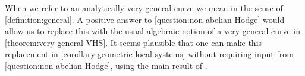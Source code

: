 \documentclass[12 pt]{amsart}
\theoremstyle{plain}
\theoremstyle{definition}
\theoremstyle{remark}
\numberwithin{equation}{section}
\begin{document}
When we refer to an analytically very general curve we mean in the sense
of \autoref{definition:general}.
A positive answer to \autoref{question:non-abelian-Hodge} would allow us to replace this with the usual algebraic notion of a very general curve in \autoref{theorem:very-general-VHS}. 
It seems plausible that one can make this replacement in \autoref{corollary:geometric-local-systems} without requiring input from \autoref{question:non-abelian-Hodge}, using the main result of \cite{cattani1995locus}. 


\end{document}
